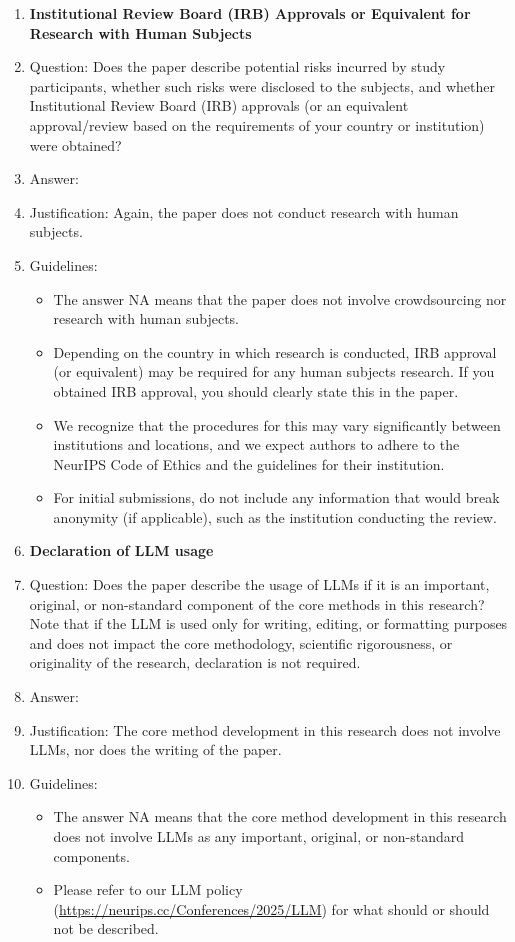 \documentclass{article}
\begin{document}
\begin{enumerate}
\item {\bf Institutional Review Board (IRB) Approvals or Equivalent for Research with Human Subjects}
    \item[] Question: Does the paper describe potential risks incurred by study participants, whether such risks were disclosed to the subjects, and whether Institutional Review Board (IRB) approvals (or an equivalent approval/review based on the requirements of your country or institution) were obtained?
    \item[] Answer: \answerNA{} %
    \item[] Justification:  Again, the paper does not conduct research with human subjects.
    \item[] Guidelines:
    \begin{itemize}
        \item The answer NA means that the paper does not involve crowdsourcing nor research with human subjects.
        \item Depending on the country in which research is conducted, IRB approval (or equivalent) may be required for any human subjects research. If you obtained IRB approval, you should clearly state this in the paper.
        \item We recognize that the procedures for this may vary significantly between institutions and locations, and we expect authors to adhere to the NeurIPS Code of Ethics and the guidelines for their institution.
        \item For initial submissions, do not include any information that would break anonymity (if applicable), such as the institution conducting the review.
    \end{itemize}


\item {\bf Declaration of LLM usage}
    \item[] Question: Does the paper describe the usage of LLMs if it is an important, original, or non-standard component of the core methods in this research? Note that if the LLM is used only for writing, editing, or formatting purposes and does not impact the core methodology, scientific rigorousness, or originality of the research, declaration is not required.
    \item[] Answer: \answerNA{} %
    \item[] Justification: The core method development in this research does not involve LLMs, nor does the writing of the paper.
    \item[] Guidelines:
    \begin{itemize}
        \item The answer NA means that the core method development in this research does not involve LLMs as any important, original, or non-standard components.
        \item Please refer to our LLM policy (\url{https://neurips.cc/Conferences/2025/LLM}) for what should or should not be described.
    \end{itemize}

\end{enumerate}
\end{document}
